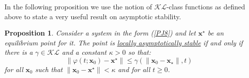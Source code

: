 \documentclass[a4paper,10pt,oneside]{book}
\newtheorem{proposition}[theorem]{Proposition}
\begin{document}
%
%
%
%
%
In the following proposition we use the notion of $\mathcal{KL}$-class functions 
as defined above to state a very useful result on asymptotic stability.
\begin{proposition}\label{LASdefEquiv}
 Consider a system in the form (\ref{PJ8}) and let $\mathbf{x}^\star$ be an equilibrium
 point for it. The point is \hyperlink{definition:LAS}{locally asymptotically stable} if and only if there is a 
 \hyperlink{K-class}{$\gamma\in\mathcal{KL}$} and a constant $\kappa>0$ so that:
\begin{equation}
 \|\varphi(t;\mathbf{x}_0)-\mathbf{x}^\star\|\leq \gamma(\|\mathbf{x}_0-\mathbf{x}_\star\|,t)\label{KLPROP}
\end{equation}
for all $\mathbf{x}_0$ such that $\|\mathbf{x}_0-\mathbf{x}^\star\|<\kappa$ and for all $t\geq 0$.
\end{proposition}
\end{document}
